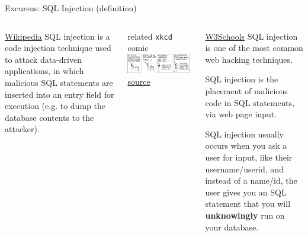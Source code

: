 \begin{frame}{Excursus: SQL Injection (definition)}

  \begin{columns}
\begin{alertblock}{\href{https://en.wikipedia.org/wiki/SQL_injection}{Wikipedia}}\footnotesize
SQL injection is a code injection technique used to attack data-driven applications, in which malicious SQL statements are inserted into an entry field for execution (e.g. to dump the database contents to the attacker).
\end{alertblock}
\bigskip

\begin{block}{related \texttt{xkcd} comic} 
\includegraphics[width=0.95\textwidth]{img/exploits_of_a_mom.png}
\scriptsize
\href{https://xkcd.com/327/}{source}
\end{block}

\begin{exampleblock}{\href{https://www.w3schools.com/sql/sql_injection.asp}{W3Schools}}\footnotesize
SQL injection is one of the most common web hacking techniques. 

SQL injection is the placement of malicious code in SQL statements, via web page input.

SQL injection usually occurs when you ask a user for input, like their username/userid, and instead of a name/id, the user gives you an SQL statement that you will \textbf{unknowingly} run on your database.
\end{exampleblock}
\end{columns}
\end{frame}

